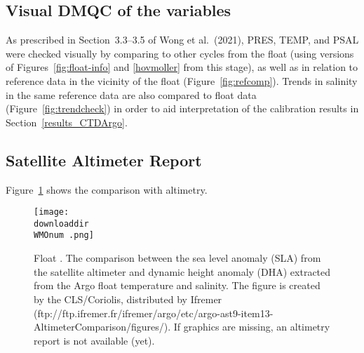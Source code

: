 \documentclass{article}
\begin{document}
\newpage
\subsection{Visual DMQC of the variables}
As prescribed in Section~3.3--3.5 of Wong et al.~(2021), PRES, TEMP, and
PSAL were checked visually by comparing to other cycles from the float
(using versions of Figures~\ref{fig:float-info} and \ref{hovmoller} from
this stage), as well as in relation to reference data in the vicinity of
the float (Figure~\ref{fig:refcomp}).  Trends in salinity in the same
reference data are also compared to float data
(Figure~\ref{fig:trendcheck}) in order to aid interpretation of the
calibration results in Section~\ref{results_CTDArgo}.
%
\begin{figure}[H] 
\end{figure}
%
\begin{figure}[H] 
\end{figure}

 

\newpage
\subsection{Satellite Altimeter Report}
Figure~\ref{Altim} shows the comparison with altimetry.
%
\begin{figure}[H]
  \centering    
  \texttt{[image: \\downloaddir\\WMOnum .png]}
  \caption{Float \WMOnum. The comparison between the sea level anomaly
    (SLA) from the satellite altimeter and dynamic height anomaly (DHA)
    extracted from the Argo float temperature and salinity. The figure is
    created by the CLS/Coriolis, distributed by Ifremer
    (ftp://ftp.ifremer.fr/ifremer/argo/etc/argo-ast9-item13-AltimeterComparison/figures/).
    If graphics are missing, an altimetry report is not available (yet).}
  \label{Altim}
\end{figure}

      
\newpage
\end{document}
